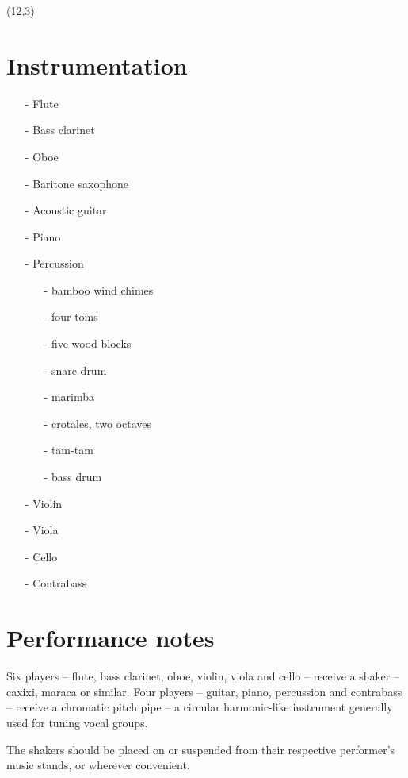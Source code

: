 \documentclass[10pt]{article}
\begin{document}
\begin{textblock}{11}(12,3)

\section{Instrumentation}

\begin{itemize}
    \item[-] Flute
    \item[-] Bass clarinet
    \item[-] Oboe
    \item[-] Baritone saxophone
    \item[-] Acoustic guitar
    \item[-] Piano
    \item[-] Percussion
        \begin{itemize}
            \item[-] bamboo wind chimes
            \item[-] four toms
            \item[-] five wood blocks
            \item[-] snare drum
            \item[-] marimba
            \item[-] crotales, two octaves
            \item[-] tam-tam
            \item[-] bass drum
        \end{itemize}
    \item[-] Violin
    \item[-] Viola
    \item[-] Cello
    \item[-] Contrabass
\end{itemize}

\section{Performance notes}

Six players -- flute, bass clarinet, oboe, violin, viola and cello -- receive a
shaker -- caxixi, maraca or similar. Four players -- guitar, piano, percussion
and contrabass -- receive a chromatic pitch pipe -- a circular harmonic-like
instrument generally used for tuning vocal groups.

The shakers should be placed on or suspended from their respective performer's
music stands, or wherever convenient.


\end{textblock}
\end{document}
